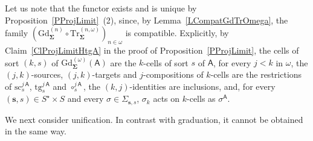 \documentclass[a4paper, reqno]{amsbook}
\newcommand{\sig}[1]{\mathbf{#1}}             %
\newcommand{\calg}[1]{\boldsymbol{\mathsf{#1}}} %
\newcommand{\src}{\mathrm{sc}}
\newcommand{\tgt}{\mathrm{tg}}
\newcommand{\Gd}{\mathrm{Gd}}
\newcommand{\Tr}{\mathrm{Tr}}
\theoremstyle{plain}
\theoremstyle{definition}
\begin{document}
Let us note that the functor exists and is unique by Proposition~\ref{PProjLimit}~(2), since, by Lemma~\ref{LCompatGdTrOmega}, the family $(\Gd^{(n)}_{\sig{\Sigma}}\circ \Tr^{(n,\omega)}_{\sig{\Sigma}})_{n\in\omega}$ is compatible.
Explicitly, by Claim~\ref{ClProjLimitHtgA} in the proof of Proposition~\ref{PProjLimit}, the cells of sort $(k,s)$ of $\Gd^{(\omega)}_{\sig{\Sigma}}(\calg{A})$ are the $k$-cells of sort $s$ of $\calg{A}$, for every $j<k$ in $\omega$, the $(j,k)$-sources, $(j,k)$-targets and $j$-compositions of $k$-cells are the restrictions of $\src^{j\,\calg{A}}_{s}$, $\tgt^{j\,\calg{A}}_{s}$ and $\circ^{j\,\calg{A}}_{s}$, the $(k,j)$-identities are inclusions, and, for every $(\mathbf{s},s)\in S^{\star}\times S$ and every $\sigma\in\Sigma_{\mathbf{s},s}$, $\sigma_{k}$ acts on $k$-cells as $\sigma^{\calg{A}}$.

We next consider unification.
In contrast with graduation, it cannot be obtained in the same way.
\end{document}
